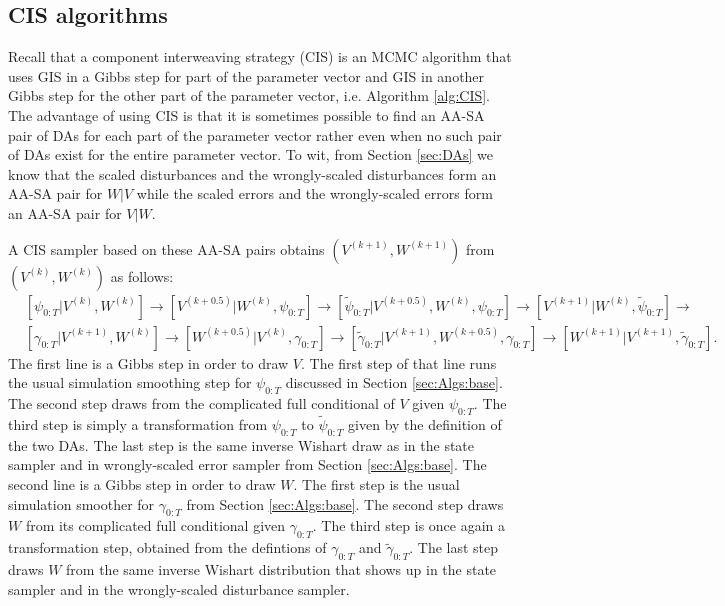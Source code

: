 \documentclass{article}
\begin{document}
\subsection{CIS algorithms}\label{sec:Algs:CIS}
Recall that a component interweaving strategy (CIS) is an MCMC algorithm that uses GIS in a Gibbs step for part of the parameter vector and GIS in another Gibbs step for the other part of the parameter vector, i.e. Algorithm \ref{alg:CIS}. The advantage of using CIS is that it is sometimes possible to find an AA-SA pair of DAs for each part of the parameter vector rather even when no such pair of DAs exist for the entire parameter vector. To wit, from Section \ref{sec:DAs} we know that the scaled disturbances and the wrongly-scaled disturbances form an AA-SA pair for $W|V$ while the scaled errors and the wrongly-scaled errors form an AA-SA pair for $V|W$. 

A CIS sampler based on these AA-SA pairs obtains $(V^{(k+1)},W^{(k+1)})$ from $(V^{(k)},W^{(k)})$ as follows:
\begin{align*}
&[\psi_{0:T}|V^{(k)},W^{(k)}] \to [V^{(k+0.5)}|W^{(k)},\psi_{0:T}] \to [\tilde{\psi}_{0:T}|V^{(k+0.5)},W^{(k)},\psi_{0:T}] \to [V^{(k+1)}|W^{(k)},\tilde{\psi}_{0:T}]\to\\
&[\gamma_{0:T}|V^{(k+1)},W^{(k)}] \to [W^{(k+0.5)}|V^{(k)},\gamma_{0:T}] \to [\tilde{\gamma}_{0:T}|V^{(k+1)},W^{(k+0.5)},\gamma_{0:T}]\to [W^{(k+1)}|V^{(k+1)},\tilde{\gamma}_{0:T}].
\end{align*}
The first line is a Gibbs step in order to draw $V$. The first step of that line runs the usual simulation smoothing step for $\psi_{0:T}$ discussed in Section \ref{sec:Algs:base}. The second step draws from the complicated full conditional of $V$ given $\psi_{0:T}$. The third step is simply a transformation from $\psi_{0:T}$ to $\tilde{\psi}_{0:T}$ given by the definition of the two DAs. The last step is the same inverse Wishart draw as in the state sampler and in wrongly-scaled error sampler from Section \ref{sec:Algs:base}. The second line is a Gibbs step in order to draw $W$. The first step is the usual simulation smoother for $\gamma_{0:T}$ from Section \ref{sec:Algs:base}. The second step draws $W$ from its complicated full conditional given $\gamma_{0:T}$. The third step is once again a transformation step, obtained from the defintions of $\gamma_{0:T}$ and $\tilde{\gamma}_{0:T}$. The last step draws $W$ from the same inverse Wishart distribution that shows up in the state sampler and in the wrongly-scaled disturbance sampler. 
\end{document}
